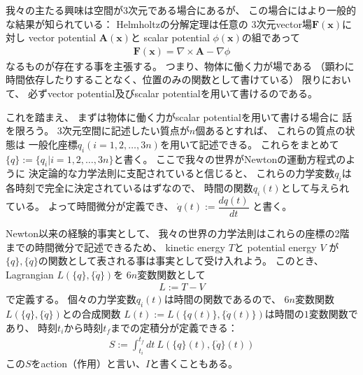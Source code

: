 \documentclass[dvipdfmx]{jsarticle}
\begin{document}
我々の主たる興味は空間が3次元である場合にあるが、
この場合にはより一般的な結果が知られている：
Helmholtzの分解定理は任意の
3次元vector場$\bm{F}(\bm{x})$に対し
vector potential $\bm{A}(\bm{x})$と
scalar potential $\phi(\bm{x})$の組であって
\begin{align}
  \bm{F}(\bm{x}) = \nabla \times \bm{A} - \nabla \phi
\end{align}
なるものが存在する事を主張する。
つまり、物体に働く力が場である
（顕わに時間依存したりすることなく、位置のみの関数として書けている）
限りにおいて、
必ずvector potential及びscalar potentialを用いて書けるのである。

これを踏まえ、
まずは物体に働く力がscalar potentialを用いて書ける場合に
話を限ろう。
3次元空間に記述したい質点が$n$個あるとすれば、
これらの質点の状態は
一般化座標$q_i$$(i=1,2,\dots,3n)$を用いて記述できる。
これらをまとめて$\{q\} := \{q_i| i=1,2,\dots,3n\}$と書く。
ここで我々の世界がNewtonの運動方程式のように
決定論的な力学法則に支配されていると信じると、
これらの力学変数$q_i$は各時刻で完全に決定されているはずなので、
時間の関数$q_i(t)$として与えられている。
よって時間微分が定義でき、
$\dot{q}(t) := \dfrac{dq(t)}{dt}$
と書く。

Newton以来の経験的事実として、
我々の世界の力学法則はこれらの座標の2階までの時間微分で記述できるため、
kinetic energy $T$と
potential energy $V$
が
$\{q\}, \{\dot{q}\}$の関数として表される事は事実として受け入れよう。
このとき、Lagrangian $L(\{q\}, \{\dot{q}\})$を
$6n$変数関数として
\begin{align}
  L := T - V
\end{align}
で定義する。
個々の力学変数$q_i(t)$は時間の関数であるので、
$6n$変数関数
$L(\{q\}, \{\dot{q}\})$との合成関数
$L(t) := L(\{q(t)\}, \{\dot{q}(t)\})$は時間の$1$変数関数であり、
時刻$t_i$から時刻$t_f$までの定積分が定義できる：
\begin{align}
  S := \int_{t_i}^{t_f}dt\ L(\{q\}(t), \{\dot{q}\}(t))
\end{align}
この$S$をaction（作用）と言い、$I$と書くこともある。
\end{document}
